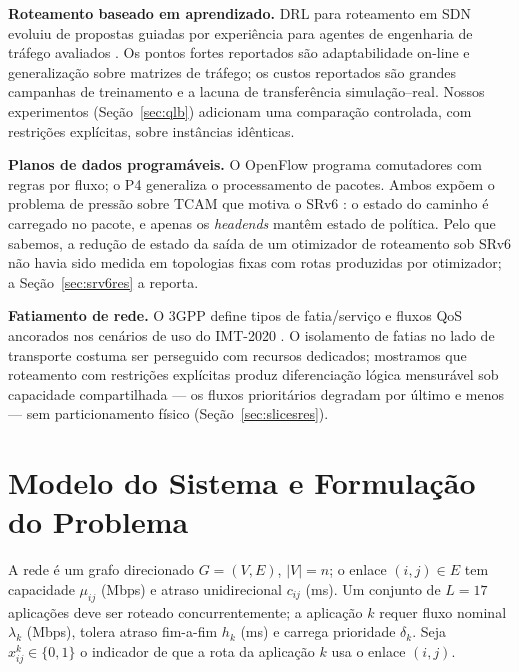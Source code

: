 \documentclass[journal]{IEEEtran}
\begin{document}
\textbf{Roteamento baseado em aprendizado.} DRL para roteamento em SDN
evoluiu de propostas guiadas por experiência
\cite{xu2018experience,stampa2017drl} para agentes de engenharia de tráfego
avaliados \cite{almasan2022drl}. Os pontos fortes reportados são
adaptabilidade on-line e generalização sobre matrizes de tráfego; os custos
reportados são grandes campanhas de treinamento e a lacuna de transferência
simulação--real. Nossos experimentos (Seção~\ref{sec:qlb}) adicionam uma
comparação controlada, com restrições explícitas, sobre instâncias idênticas.

\textbf{Planos de dados programáveis.} O OpenFlow \cite{mckeown2008} programa
comutadores com regras por fluxo; o P4 \cite{bosshart2014} generaliza o
processamento de pacotes. Ambos expõem o problema de pressão sobre TCAM que
motiva o SRv6 \cite{rfc8402,rfc8754,rfc8986,rfc9256}: o estado do caminho é
carregado no pacote, e apenas os \emph{headends} mantêm estado de política.
Pelo que sabemos, a redução de estado da saída de um otimizador de
roteamento sob SRv6 não havia sido medida em topologias fixas com rotas
produzidas por otimizador; a Seção~\ref{sec:srv6res} a reporta.

\textbf{Fatiamento de rede.} O 3GPP define tipos de fatia/serviço e fluxos
QoS \cite{3gpp-ts23501} ancorados nos cenários de uso do IMT-2020
\cite{itu-m2083}. O isolamento de fatias no lado de transporte
costuma ser perseguido com recursos dedicados; mostramos que roteamento com
restrições explícitas produz diferenciação lógica mensurável sob capacidade
compartilhada --- os fluxos prioritários degradam por último e menos ---
sem particionamento físico (Seção~\ref{sec:slicesres}).

\section{Modelo do Sistema e Formulação do Problema}
\label{sec:model}
A rede é um grafo direcionado $G=(V,E)$, $|V|=n$; o enlace $(i,j)\in E$ tem
capacidade $\mu_{ij}$ (Mbps) e atraso unidirecional $c_{ij}$ (ms). Um
conjunto de $L=17$ aplicações deve ser roteado concurrentemente; a aplicação
$k$ requer fluxo nominal $\lambda_k$ (Mbps), tolera atraso fim-a-fim $h_k$
(ms) e carrega prioridade $\delta_k$. Seja $x_{ij}^{k}\in\{0,1\}$ o indicador
de que a rota da aplicação $k$ usa o enlace $(i,j)$.
\end{document}

